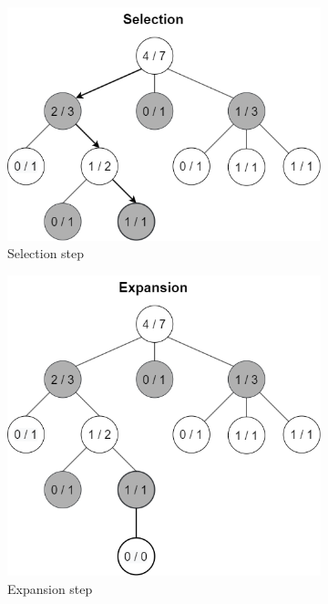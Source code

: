 \begin{figure}
\centering
\begin{subfigure}{.5\textwidth}
  \centering
  \includegraphics[width=.8\linewidth]{figures/MCTS Selection}
  \caption{Selection step}
  \label{fig:MCTS Selection}
\end{subfigure}%
\begin{subfigure}{.5\textwidth}
  \centering
  \includegraphics[width=.8\linewidth]{figures/MCTS Expansion}
  \caption{Expansion step}
  \label{fig:MCTS Expansion}
\end{subfigure}
\begin{subfigure}{.5\textwidth}
  \centering

\end{subfigure}
\end{figure}
